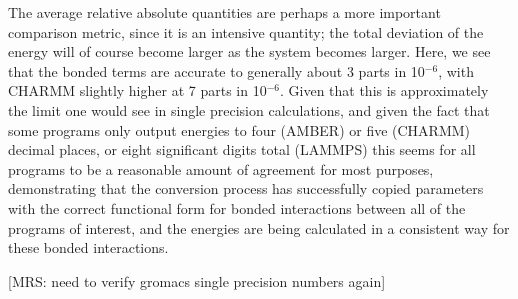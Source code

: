 The average relative absolute quantities are perhaps a more important
comparison metric, since it is an intensive quantity; the total
deviation of the energy will of course become larger as the system
becomes larger. Here, we see that the bonded terms are accurate to
generally about 3 parts in 10$^{-6}$, with CHARMM slightly higher at 7
parts in 10$^{-6}$. Given that this is approximately the limit one
would see in single precision calculations, and given the fact that
some programs only output energies to four (AMBER) or five (CHARMM)
decimal places, or eight significant digits total (LAMMPS) this seems
for all programs to be a reasonable amount of agreement for most
purposes, demonstrating that the conversion process has successfully
copied parameters with the correct functional form for bonded
interactions between all of the programs of interest, and the energies
are being calculated in a consistent way for these bonded
interactions.

[MRS: need to verify gromacs single precision numbers again]

